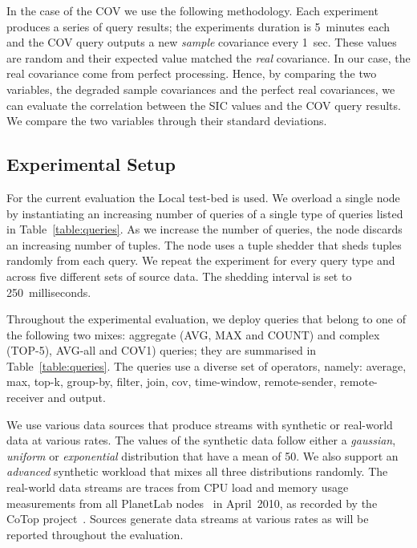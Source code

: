In the case of the \textnormal{COV} we use the following methodology. Each experiment
produces a series of query results; the experiments duration is
5~minutes each and the \textnormal{COV} query outputs a new \emph{sample} 
covariance every 1~sec. These values are random and their expected value 
matched the \emph{real} covariance. 
In our case, the real covariance come from perfect processing. Hence, by comparing
the two variables, \ie the degraded sample covariances and the perfect real
covariances, we can evaluate the correlation between the SIC values and the 
\textnormal{COV} query results. We compare the two variables through their
standard deviations.  



\subsection{Experimental Setup}

For the current evaluation the Local test-bed is used. We overload a single 
\sys node by instantiating an increasing number of queries of a single type of 
queries listed in Table~\ref{table:queries}. 
As we increase the number of queries, the node discards an increasing number 
of tuples. The node uses a tuple shedder that sheds tuples randomly from each query.
We repeat the experiment for every query type and across five different 
sets of source data. The shedding interval is set to 250~milliseconds.

Throughout the experimental evaluation, we deploy queries that belong to one
of the following two mixes: aggregate (\ie \textnormal{AVG}, \textnormal{MAX}
and \textnormal{COUNT}) and complex (\ie \textnormal{TOP-5}), \textnormal{AVG-all} and 
\textnormal{COV1}) queries; they are
summarised in Table~\ref{table:queries}. The queries use a diverse set of
operators, namely: \textnormal{average}, \textnormal{max}, \textnormal{top-k}, 
\textnormal{group-by}, \textnormal{filter}, \textnormal{join}, \textnormal{cov}, 
\textnormal{time-window}, \textnormal{remote-sender}, \textnormal{remote-receiver} 
and \textnormal{output}.

We use various data sources that produce streams with synthetic or real-world
data at various rates. The values of the synthetic data follow either a
\emph{gaussian}, \emph{uniform} or \emph{exponential} distribution that
have a mean of 50. We also support an \emph{advanced} synthetic workload that mixes all three
distributions randomly. The real-world data streams are traces from CPU load and memory
usage measurements from all PlanetLab nodes~\cite{planetlab} in April~2010, as
recorded by the CoTop project~\cite{cotop}. 
Sources generate data streams at various rates as will be reported throughout 
the evaluation. 

